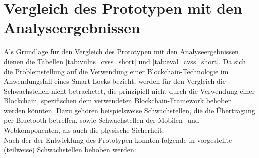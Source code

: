 \section{Vergleich des Prototypen mit den Analyseergebnissen}
\label{sec:comparison}
    Als Grundlage für den Vergleich des Prototypen mit den Analyseergebnissen dienen die Tabellen \ref{tab:vulns_cvss_short} und \ref{tab:eval_cvss_short}.
    Da sich die Problemstellung auf die Verwendung einer Blockchain-Technologie im Anwendungsfall eines Smart Locks bezieht, werden für den Vergleich die Schwachstellen nicht betrachetet, die prinzipiell nicht durch die Verwendung einer Blockchain, spezifischen dem verwendeten Blockchain-Framework behoben werden könnten. 
    Dazu gehören beispielsweise Schwachstellen, die die Übertragung per Bluetooth betreffen, sowie Schwachstellen der Mobilen- und Webkomponenten, als auch die physische Sicherheit. 
    \bigskip\\
    Nach der der Entwicklung des Prototypen konnten folgende in  vorgestellte (teilweise) Schwachstellen behoben werden:
